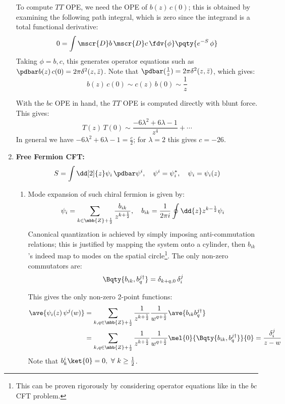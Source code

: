 \documentclass[a4paper,10pt]{article}
\begin{document}
\begin{enumerate}
	To compute $TT$ OPE, we need the OPE of $b(z)\,c(0)$; this is obtained by examining the following path integral, which is zero since the integrand is a total functional derivative:
	\begin{equation}
		0 = \int \mscr{D}b\,\mscr{D}c\,
			\fdv{\phi}\pqty{e^{-S}\,\phi}
	\end{equation}
	Taking $\phi=b,c$, this generates operator equations such as $
		\pdbar b(z)\,c(0)
		= 2\pi\delta^2(z,\bar{z})
	$. Note that $
		\pdbar(\frac{1}{z})
		= 2\pi\delta^2(z,\bar{z})
	$, which gives:
	\begin{equation}
		b(z)\,c(0) \sim c(z)\,b(0)
		\sim \frac{1}{z}
	\end{equation}
	
	With the $bc$ OPE in hand, the $TT$ OPE is computed directly with blunt force. This gives:
	\begin{equation}
		T(z)\,T(0)
		\sim \frac{
			-6\lambda^2 + 6\lambda - 1
		}{z^4} + \cdots
	\end{equation}
	In general we have $
		-6\lambda^2 + 6\lambda - 1
		= \frac{c}{2}
	$; for $\lambda = 2$ this gives $c = -26$. 
	\qedfull
	
	\item \textbf{Free Fermion CFT:}
	\begin{equation}
		S = \int \dd[2]{z}
			\psi_i\,\pdbar\psi^i,\quad
		\psi^i = \psi_i^*,\quad
		\psi_i = \psi_i(z)
	\end{equation}
	
	\begin{enumerate}
	\item Mode expansion of such chiral fermion is given by:
	\begin{equation}
		\psi_i = \sum_{
			k\in\mbb{Z}+\frac{1}{2}
		} \frac{b_{ik}}{z^{k+\frac{1}{2}}},\quad
		b_{ik}
		= \frac{1}{2\pi i} \oint \dd{z}
			z^{k-\frac{1}{2}} \psi_i
	\end{equation}
	Canonical quantization is achieved by simply imposing anti-commutation relations; this is justified by mapping the system onto a cylinder, then $b_{ik}$'s indeed map to modes on the spatial circle\footnote{
		This can be proven rigorously by considering operator equations like in the $bc$ CFT problem. 
	}. The only non-zero commutators are:
	\begin{equation}
		\Bqty{b_{ik},b^{j\dagger}_q}
		= \delta_{k+q,0}\,\delta^j_i
	\end{equation}
	
	This gives the only non-zero 2-point functions:
	\begin{equation}
	\begin{aligned}
		\ave{
			\psi_i(z)\,\psi^j(w)
		}
		&= \sum_{k,q\in\mbb{Z}+\frac{1}{2}}
			\frac{1}{z^{k+\frac{1}{2}}}
			\frac{1}{w^{q+\frac{1}{2}}}
			\ave{b_{ik} b^{j\dagger}_q} \\
		&= \sum_{k,q\in\mbb{Z}+\frac{1}{2}}
			\frac{1}{z^{k+\frac{1}{2}}}
			\frac{1}{w^{q+\frac{1}{2}}}
			\mel{0}{
				\Bqty{b_{ik},b^{j\dagger}_q}
			}{0}
		= \frac{\delta^j_i}{z-w}
	\end{aligned}
	\end{equation}
	Note that $
		b^i_k\ket{0} = 0,\ %
		\forall\ k\ge\frac{1}{2}
	$. 
	

\end{enumerate}
\end{enumerate}
\end{document}
